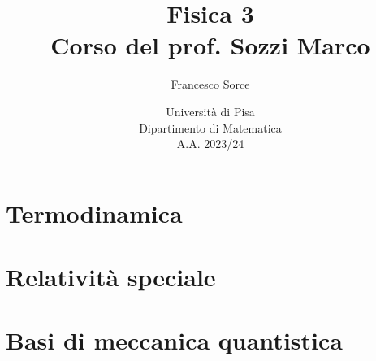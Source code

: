 \documentclass[a4paper]{report}
\title{Fisica 3\\
\large Corso del prof. Sozzi Marco}
\author{Francesco Sorce}
\date{Università di Pisa\\
Dipartimento di Matematica\\
A.A. 2023/24}
\begin{document}
\maketitle

\tableofcontents
\newpage


\part{Termodinamica}








\part{Relativit\`a speciale}



\part{Basi di meccanica quantistica}


\appendix


%
\end{document}

